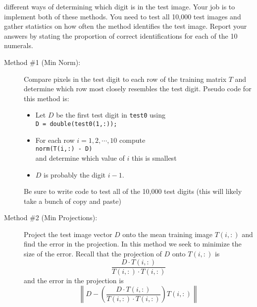 \begin{problem}
\begin{enumerate}
            different ways of determining which digit is in the test image.  Your job is
            to implement both of these methods.  You need to test all 10,000 test images and
            gather statistics on how often the method identifies the test image.  Report
            your answers by stating the proportion of correct identifications for each of
            the 10 numerals.
            \begin{description}
                \item[Method \#1 (Min Norm):] Compare pixels in the test digit to each row of the
                    training matrix $T$ and determine which row most closely resembles the
                    test digit.  Pseudo code for this method is:
                    \begin{itemize}
                        \item Let $D$ be the first test digit in \texttt{test0} using \\
                            \verb|D = double(test0(1,:));|
                        \item For each row $i=1, 2, \cdots, 10$ compute \\
                            \verb|norm(T(i,:) - D)| \\
                            and determine which value of $i$ this is smallest
                        \item $D$ is probably the digit $i-1$.
                    \end{itemize}
                    Be sure to write code to test all of the 10,000 test digits (this will
                    likely take a bunch of copy and paste)
                \item[Method \#2 (Min Projections):] Project the test image vector $D$
                    onto the mean training image $T(i,:)$ and find the error in the
                    projection.  In this method we seek to minimize the size of the error.
                    Recall that the projection of $D$ onto $T(i,:)$ is 
                    \[ \frac{D \cdot T(i,:)}{T(i,:) \cdot T(i,:)} \]
                    and the error in the projection is 
                    \[ \left\| D - \left( \frac{D \cdot T(i,:)}{T(i,:) \cdot T(i,:)} \right)
                    T(i,:) \right\| \]
            \end{description}
    \end{enumerate}
\end{problem}



